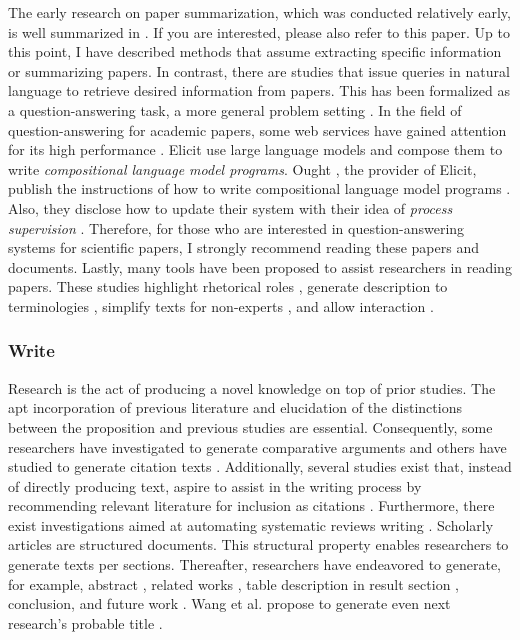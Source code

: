 \documentclass{book}
\begin{document}
The early research on paper summarization, which was conducted relatively early, is well summarized in \cite{altmami2022automatic}. If you are interested, please also refer to this paper.
Up to this point, I have described methods that assume extracting specific information or summarizing papers. In contrast, there are studies that issue queries in natural language to retrieve desired information from papers. This has been formalized as a question-answering task, a more general problem setting \cite{lu2022learn,ruggeri2022argscichat,saikh2022scienceqa}. 
In the field of question-answering for academic papers, some web services have gained attention for its high performance \cite{elicit,scispace}. Elicit use large language models and compose them to write \textit{compositional language model programs}. Ought \cite{ought}, the provider of Elicit, publish the instructions of how to write compositional language model programs \cite{primer2022}. Also, they disclose how to update their system with their idea of \textit{process supervision} \cite{reppert2023iterated}. Therefore, for those who are interested in question-answering systems for scientific papers, I strongly recommend reading these papers and documents.
Lastly, many tools have been proposed to assist researchers in reading papers. These studies highlight rhetorical roles \cite{fok2023scim,lauscher2018arguminsci}, generate description to terminologies \cite{august2022generating,head2021augmenting,murthy2022accord}, simplify texts for non-experts \cite{august2022paper,jeblick2022chatgpt}, and allow interaction \cite{kang2022threddy,elicit,scispace}.
\subsubsection{Write}
Research is the act of producing a novel knowledge on top of prior studies. The apt incorporation of previous literature and elucidation of the distinctions between the proposition and previous studies are essential. Consequently, some researchers have investigated to generate comparative arguments \cite{yu2022scientific} and others have studied to generate citation texts \cite{arita2022citation,gu2022controllable,wang2021autocite,xing2020automatic,funkquist2022citebench}. Additionally, several studies exist that, instead of directly producing text, aspire to assist in the writing process by recommending relevant literature for inclusion as citations \cite{farber2020citation,zhang2020dual,duma2019contextual,farber2018cite,gosangi2021use}. Furthermore, there exist investigations aimed at automating systematic reviews writing \cite{dones2022systematic}.
Scholarly articles are structured documents. This structural property enables researchers to generate texts per sections. Thereafter, 
researchers have endeavored to generate, for example, abstract \cite{kumarasinghe2022automatic,gao2022comparing,wang2019paperrobot}, related works \cite{li2022automatic,shah2021generating,liu2023causal}, table description in result section \cite{moosavi2021scigen,moosavi2021learning}, conclusion, and future work \cite{wang2019paperrobot}. Wang et al. propose to generate even next research's probable title \cite{wang2019paperrobot}.
\end{document}
